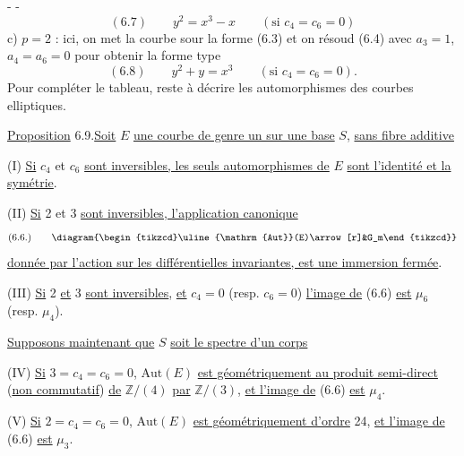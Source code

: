 -  -
\[
(6.7)\qquad y^2=x^3-x\qquad(\text{si }c_4=c_6=0)
\]
c) $p=2$ : ici, on met la courbe sour la forme (6.3) et on résoud (6.4) avec $a_3=1$, $a_4=a_6=0$ pour obtenir la forme type
\[
(6.8)\qquad y^2+y=x^3\qquad(\text{si }c_4=c_6=0).
\]
Pour compléter le tableau, reste à décrire les automorphismes des courbes elliptiques.

\uline{Proposition} 6.9.\quad\uline{Soit} $E$ \uline{une courbe de genre un sur une base} $S$, \uline{sans fibre additive}

(I) \uline{Si} $c_4$ et $c_6$ \uline{sont inversibles, les seuls automorphismes de} $E$ \uline{sont l'identité et la symétrie}.

(II) \uline{Si} 2 et 3 \uline{sont inversibles, l'application canonique}
\[
(6.6.)\qquad\diagram{\begin{tikzcd}\uline{\mathrm{Aut}}(E)\arrow[r]&G_m\end{tikzcd}}
\]
\uline{donnée par l'action sur les différentielles invariantes, est une immersion fermée}.

(III) \uline{Si} 2 \uline{et} 3 \uline{sont inversibles}, \uline{et} $c_4=0$ (resp. $c_6=0$) \uline{l'image de} (6.6) \uline{est} $\mu_6$ (resp. $\mu_4$).

\uline{Supposons maintenant que} $S$ \uline{soit le spectre d'un corps}

(IV) \uline{Si} $3=c_4=c_6=0$, $\mathrm{Aut}(E)$ \uline{est géométriquement  au produit semi-direct} (\uline{non commutatif}) \uline{de} $\mathbb Z/(4)$ \uline{par} $\mathbb Z/(3)$, \uline{et l'image de} (6.6) \uline{est} $\mu_4$.

(V) \uline{Si} $2=c_4=c_6=0$, $\mathrm{Aut}(E)$ \uline{est géométriquement d'ordre} 24, \uline{et l'image de} (6.6) \uline{est} $\mu_3$.
\margin{\unsure{$\rho$}}
